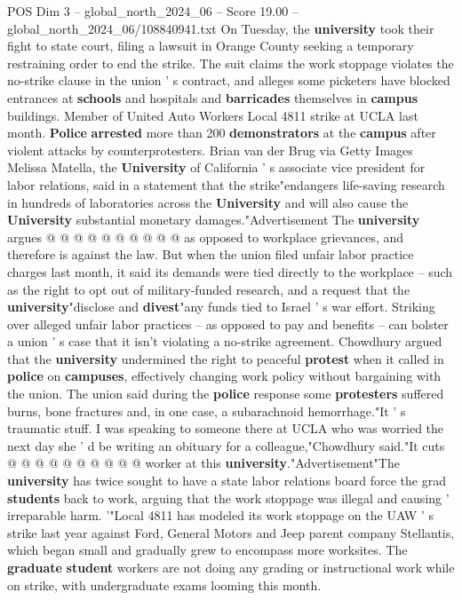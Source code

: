 \begin{textsample}{POS Dim 3 – global\_north\_2024\_06 – Score 19.00 – global\_north\_2024\_06/108840941.txt}
On Tuesday, the \textbf{university} took their fight to state court, filing a lawsuit in Orange County seeking a temporary restraining order to end the strike.
The suit claims the work stoppage violates the no-strike clause in the union ' s contract, and alleges some picketers have blocked entrances at \textbf{schools} and hospitals and \textbf{barricades} themselves in \textbf{campus} buildings.
Member of United Auto Workers Local 4811 strike at UCLA last month. \textbf{Police} \textbf{arrested} more than 200 \textbf{demonstrators} at the \textbf{campus} after violent attacks by counterprotesters.
Brian van der Brug via Getty Images Melissa Matella, the \textbf{University} of California ' s associate vice president for labor relations, said in a statement that the strike"endangers life-saving research in hundreds of laboratories across the \textbf{University} and will also cause the \textbf{University} substantial monetary damages."Advertisement The \textbf{university} argues @ @ @ @ @ @ @ @ @ @ as opposed to workplace grievances, and therefore is against the law.
But when the union filed unfair labor practice charges last month, it said its demands were tied directly to the workplace -- such as the right to opt out of military-funded research, and a request that the \textbf{university}"disclose and \textbf{divest}"any funds tied to Israel ' s war effort.
Striking over alleged unfair labor practices -- as opposed to pay and benefits -- can bolster a union ' s case that it isn't violating a no-strike agreement.
Chowdhury argued that the \textbf{university} undermined the right to peaceful \textbf{protest} when it called in \textbf{police} on \textbf{campuses}, effectively changing work policy without bargaining with the union.
The union said during the \textbf{police} response some \textbf{protesters} suffered burns, bone fractures and, in one case, a subarachnoid hemorrhage."It ' s traumatic stuff.
I was speaking to someone there at UCLA who was worried the next day she ' d be writing an obituary for a colleague,"Chowdhury said."It cuts @ @ @ @ @ @ @ @ @ @ worker at this \textbf{university}."Advertisement"The \textbf{university} has twice sought to have a state labor relations board force the grad \textbf{students} back to work, arguing that the work stoppage was illegal and causing ' irreparable harm. '"Local 4811 has modeled its work stoppage on the UAW ' s strike last year against Ford, General Motors and Jeep parent company Stellantis, which began small and gradually grew to encompass more worksites.
The \textbf{graduate} \textbf{student} workers are not doing any grading or instructional work while on strike, with undergraduate exams looming this month.

\end{textsample}
